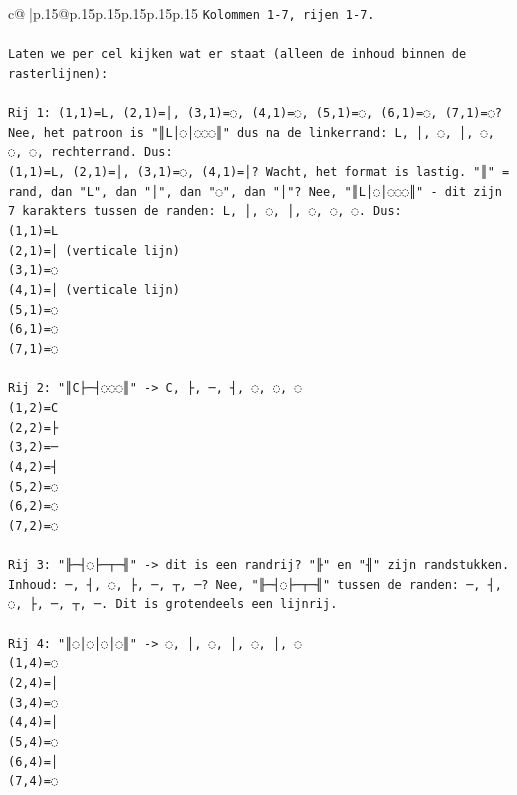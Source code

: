 \documentclass{article}
\begin{document}
{\begin{supertabular}{c@{$\;$}|p{.15\linewidth}@{}p{.15\linewidth}p{.15\linewidth}p{.15\linewidth}p{.15\linewidth}p{.15\linewidth}}
{{{\texttt{Kolommen 1{-}7, rijen 1{-}7.} \\
\\ 
\texttt{Laten we per cel kijken wat er staat (alleen de inhoud binnen de rasterlijnen):} \\
\\ 
\texttt{Rij 1: (1,1)=L, (2,1)=│, (3,1)=◌, (4,1)=◌, (5,1)=◌, (6,1)=◌, (7,1)=◌? Nee, het patroon is "║L│◌│◌◌◌║" dus na de linkerrand: L, │, ◌, │, ◌, ◌, ◌, rechterrand. Dus:} \\
\texttt{(1,1)=L, (2,1)=│, (3,1)=◌, (4,1)=│? Wacht, het format is lastig. "║" = rand, dan "L", dan "│", dan "◌", dan "│"? Nee, "║L│◌│◌◌◌║" {-} dit zijn 7 karakters tussen de randen: L, │, ◌, │, ◌, ◌, ◌. Dus:} \\
\texttt{(1,1)=L} \\
\texttt{(2,1)=│ (verticale lijn)} \\
\texttt{(3,1)=◌} \\
\texttt{(4,1)=│ (verticale lijn)} \\
\texttt{(5,1)=◌} \\
\texttt{(6,1)=◌} \\
\texttt{(7,1)=◌} \\
\\ 
\texttt{Rij 2: "║C├─┤◌◌◌║" {-}> C, ├, ─, ┤, ◌, ◌, ◌} \\
\texttt{(1,2)=C} \\
\texttt{(2,2)=├} \\
\texttt{(3,2)=─} \\
\texttt{(4,2)=┤} \\
\texttt{(5,2)=◌} \\
\texttt{(6,2)=◌} \\
\texttt{(7,2)=◌} \\
\\ 
\texttt{Rij 3: "╟─┤◌├─┬─╢" {-}> dit is een randrij? "╟" en "╢" zijn randstukken. Inhoud: ─, ┤, ◌, ├, ─, ┬, ─? Nee, "╟─┤◌├─┬─╢" tussen de randen: ─, ┤, ◌, ├, ─, ┬, ─. Dit is grotendeels een lijnrij.} \\
\\ 
\texttt{Rij 4: "║◌│◌│◌│◌║" {-}> ◌, │, ◌, │, ◌, │, ◌} \\
\texttt{(1,4)=◌} \\
\texttt{(2,4)=│} \\
\texttt{(3,4)=◌} \\
\texttt{(4,4)=│} \\
\texttt{(5,4)=◌} \\
\texttt{(6,4)=│} \\
\texttt{(7,4)=◌} \\
}}}
\end{supertabular}}
\end{document}
